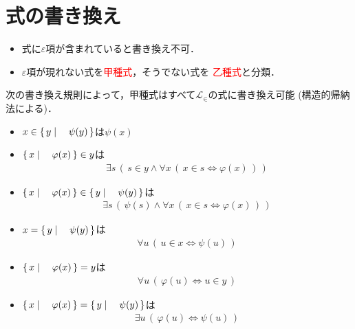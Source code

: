 \section{式の書き換え}
	\begin{itemize}
		\item 式に$\varepsilon$項が含まれていると書き換え不可．
		
		\item $\varepsilon$項が現れない式を\textcolor{red}{甲種式}，そうでない式を
			\textcolor{red}{乙種式}と分類．
	\end{itemize}
	
	次の書き換え規則によって，甲種式はすべて$\mathcal{L}_{\in}$の式に書き換え可能
	(構造的帰納法による)．
	
	\begin{itemize}
		\item $x \in \left\{\, y \mid \quad \psi(y)\, \right\}$は$\psi(x)$
		\item $\left\{\, x \mid \quad \varphi(x)\, \right\} \in y$は
			\begin{align}
				\exists s\, \left(\, s \in y \wedge 
				\forall x\, \left(\, x \in s \Longleftrightarrow \varphi(x)\, \right)\, \right)
			\end{align}
			
		\item $\left\{\, x \mid \quad \varphi(x)\, \right\} \in \left\{\, y \mid \quad \psi(y)\, \right\}$は
			\begin{align}
				\exists s\, \left(\, \psi(s) \wedge 
				\forall x\, \left(\, x \in s \Longleftrightarrow \varphi(x)\, \right)\, \right)
			\end{align}

\newpage
		\item $x = \left\{\, y \mid \quad \psi(y)\, \right\}$は
			\begin{align}
				\forall u\, \left(\, u \in x \Longleftrightarrow \psi(u)\, \right)
			\end{align}
		
		\item $\left\{\, x \mid \quad \varphi(x)\, \right\} = y$は
			\begin{align}
				\forall u\, \left(\, \varphi(u) \Longleftrightarrow u \in y\, \right)
			\end{align}
			
		\item $\left\{\, x \mid \quad \varphi(x)\, \right\} = \left\{\, y \mid \quad \psi(y)\, \right\}$は
			\begin{align}
				\exists u\, \left(\, \varphi(u) \Longleftrightarrow \psi(u)\, \right)
			\end{align}
	\end{itemize}